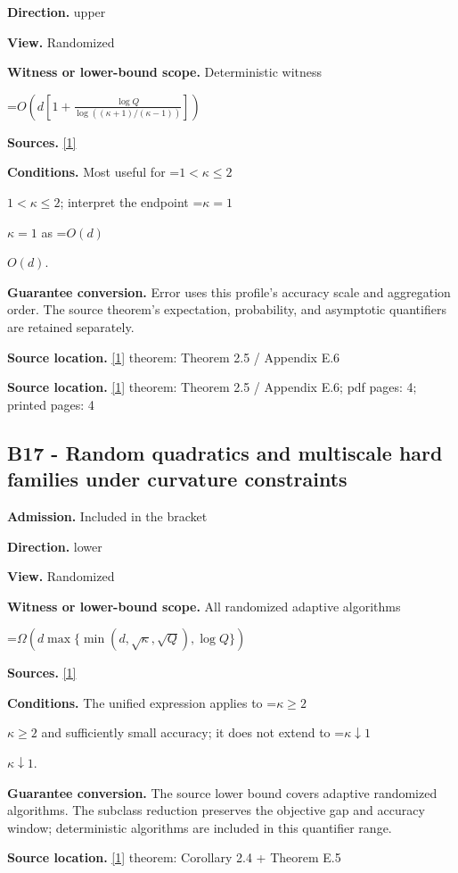 \documentclass[10pt,a4paper]{article}
\newcommand{\AtlasMath}[1]{\par\begingroup\centering\setbox0=\hbox{$\displaystyle #1$}\ifdim\wd0>1.4\linewidth\typeout{ATLAS WIDE FORMULA: \the\wd0}\fi\ifdim\wd0>\linewidth\resizebox{\linewidth}{!}{\box0}\else\box0\fi\par\endgroup}
\newcommand{\AtlasInlineMath}[1]{\begingroup\setbox0=\hbox{$#1$}\ifdim\wd0>.4\linewidth\endgroup\AtlasMath{#1}\else\endgroup$#1$\fi}
\begin{document}
\textbf{Direction.} upper

\textbf{View.} Randomized

\textbf{Witness or lower-bound scope.} Deterministic witness

\AtlasMath{O\!\left(d\left[1+\frac{\log Q}{\log((\kappa+1)/(\kappa-1))}\right]\right)}
\textbf{Sources.} \href{https://arxiv.org/html/2610.00345v1}{[1]}

\textbf{Conditions.} Most useful for \AtlasInlineMath{1<\kappa\le2}; interpret the endpoint \AtlasInlineMath{\kappa=1} as \AtlasInlineMath{O(d)}.

\textbf{Guarantee conversion.} Error uses this profile's accuracy scale and aggregation order. The source theorem's expectation, probability, and asymptotic quantifiers are retained separately.

\textbf{Source location.} \href{https://arxiv.org/html/2610.00345v1}{[1]} theorem: Theorem 2.5 / Appendix E.6

\textbf{Source location.} \href{https://arxiv.org/html/2610.00345v1}{[1]} theorem: Theorem 2.5 / Appendix E.6; pdf pages: 4; printed pages: 4

\subsection{B17 - Random quadratics and multiscale hard families under curvature constraints}
\textbf{Admission.} Included in the bracket

\textbf{Direction.} lower

\textbf{View.} Randomized

\textbf{Witness or lower-bound scope.} All randomized adaptive algorithms

\AtlasMath{\Omega\!\left(d\max\{\min(d,\sqrt\kappa,\sqrt Q),\log Q\}\right)}
\textbf{Sources.} \href{https://arxiv.org/html/2610.00345v1}{[1]}

\textbf{Conditions.} The unified expression applies to \AtlasInlineMath{\kappa\ge2} and sufficiently small accuracy; it does not extend to \AtlasInlineMath{\kappa\downarrow1}.

\textbf{Guarantee conversion.} The source lower bound covers adaptive randomized algorithms. The subclass reduction preserves the objective gap and accuracy window; deterministic algorithms are included in this quantifier range.

\textbf{Source location.} \href{https://arxiv.org/html/2610.00345v1}{[1]} theorem: Corollary 2.4 + Theorem E.5
\end{document}
